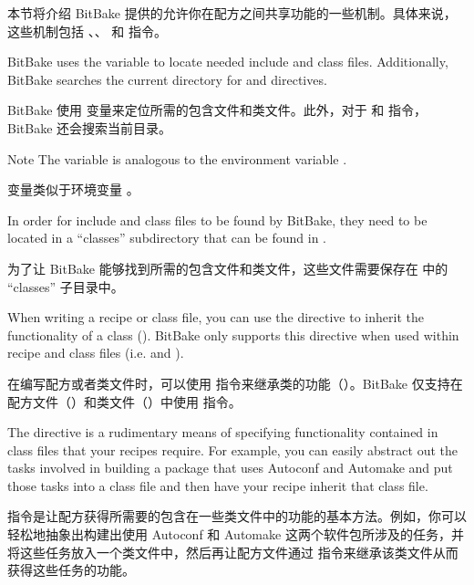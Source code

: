本节将介绍 BitBake 提供的允许你在配方之间共享功能的一些机制。具体来说，这些机制包括 、、 和 指令。


BitBake uses the  variable to locate needed include and class files. Additionally, BitBake searches the current directory for  and  directives.

BitBake 使用  变量来定位所需的包含文件和类文件。此外，对于  和  指令，BitBake 还会搜索当前目录。

\begin{noteblock}{Note}%
The  variable is analogous to the environment variable .

\medskip
{} 变量类似于环境变量 。
\end{noteblock}


In order for include and class files to be found by BitBake, they need to be located in a ``classes'' subdirectory that can be found in .

为了让 BitBake 能够找到所需的包含文件和类文件，这些文件需要保存在  中的 ``classes'' 子目录中。

\label{section:inherit}

When writing a recipe or class file, you can use the  directive to inherit the functionality of a class (). BitBake only supports this directive when used within recipe and class files (i.e.  and ).

在编写配方或者类文件时，可以使用  指令来继承类的功能（）。BitBake 仅支持在配方文件（）和类文件（）中使用  指令。

The  directive is a rudimentary means of specifying functionality contained in class files that your recipes require. For example, you can easily abstract out the tasks involved in building a package that uses Autoconf and Automake and put those tasks into a class file and then have your recipe inherit that class file.

 指令是让配方获得所需要的包含在一些类文件中的功能的基本方法。例如，你可以轻松地抽象出构建出使用 Autoconf 和 A​​utomake 这两个软件包所涉及的任务，并将这些任务放入一个类文件中，然后再让配方文件通过  指令来继承该类文件从而获得这些任务的功能。

